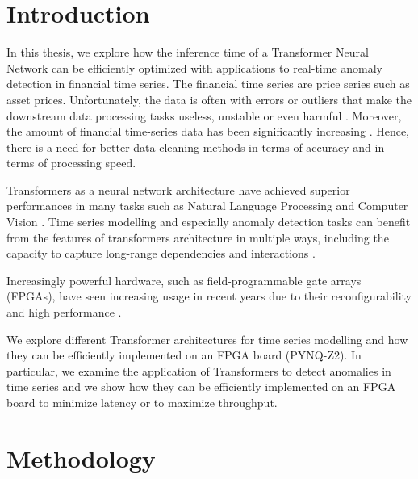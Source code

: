 \documentclass[a4paper, twoside]{report}
\theoremstyle{definition}
\numberwithin{equation}{section}
\begin{document}
\chapter*{Introduction}


In this thesis, we explore how the inference time of a Transformer Neural Network can be efficiently optimized with applications to real-time anomaly detection in financial time series.
The financial time series are price series such as asset prices.
Unfortunately, the data is often with errors or outliers that make the downstream data processing tasks useless, unstable or even harmful \cite{Falkenberry_2008} \cite{Vallis_Hochenbaum_Twitter}. Moreover, the amount of financial time-series data has been significantly increasing \cite{AnomalyDataBig}.
Hence, there is a need for better data-cleaning methods in terms of accuracy and in terms of processing speed.

Transformers as a neural network architecture have achieved superior performances in many tasks such as Natural Language Processing and Computer Vision \cite{TransformersNLP}.
Time series modelling and especially anomaly detection tasks can benefit from the features of transformers architecture in multiple ways, including the capacity to capture long-range dependencies and interactions \cite{2202.07125}.

Increasingly powerful hardware, such as field-programmable gate arrays (FPGAs), have seen increasing usage in recent years due to their reconfigurability and high performance \cite{10.1007/978-3-319-56258-2_14}.

We explore different Transformer architectures for time series modelling and how they can be efficiently implemented on an FPGA board (PYNQ-Z2).
In particular, we examine the application of Transformers to detect anomalies in time series and we show how they can be efficiently implemented on an FPGA board to minimize latency or to maximize throughput.


\chapter{Methodology}
\end{document}
